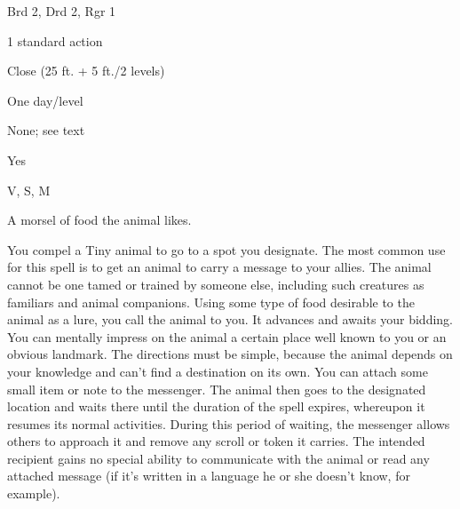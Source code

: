 
\begin{description*}
\item[Level:] Brd 2, Drd 2, Rgr 1
\item[Casting Time:] 1 standard action
\item[Range:] Close (25 ft. + 5 ft./2 levels)
\item[Duration:] One day/level
\item[Saving Throw:] None; see text
\item[Spell Resistance:] Yes
\item[Components:] V, S, M
\item[Arcane Material Component:] A morsel of food the animal likes.
\end{description*}

You compel a Tiny animal to go to a spot you designate. The most common use for
this spell is to get an animal to carry a message to your allies. The animal cannot
be one tamed or trained by someone else, including such creatures as familiars
and animal companions.
Using some type of food desirable to the animal as a lure, you call the animal
to you. It advances and awaits your bidding. You can mentally impress on the animal
a certain place well known to you or an obvious landmark. The directions must be
simple, because the animal depends on your knowledge and can't find a destination
on its own. You can attach some small item or note to the messenger. The animal
then goes to the designated location and waits there until the duration of the
spell expires, whereupon it resumes its normal activities.
During this period of waiting, the messenger allows others to approach it and remove
any scroll or token it carries. The intended recipient gains no special ability
to communicate with the animal or read any attached message (if it's written in
a language he or she doesn't know, for example).